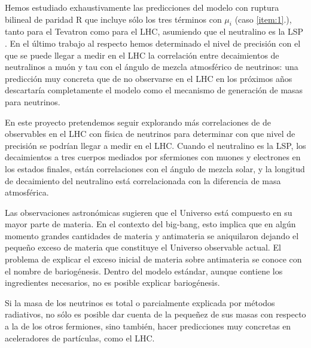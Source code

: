 Hemos estudiado
exhaustivamente las predicciones del modelo con ruptura bilineal de
paridad R que incluye sólo los tres términos con $\mu_i$ (caso
\ref{item:1}.), tanto para el Tevatron como para el LHC, asumiendo que
el neutralino es la LSP
\cite{Magro:2003zb,deCampos:2005ri,deCampos:2007bn,deCampos:2008ic,deCampos:2008re,DeCampos:2010yu}. En
el último trabajo al respecto hemos determinado el nivel de precisión
con el que se puede llegar a medir en el LHC la correlación entre
decaimientos de neutralinos a muón y tau con el ángulo de mezcla
atmosférico de neutrinos: una predicción muy concreta que de no
observarse en el LHC en los próximos años descartaría completamente el
modelo como el mecanismo de generación de masas para neutrinos.
\begin{proyecto}
  En este proyecto pretendemos seguir explorando más correlaciones de
  de observables en el LHC con física de neutrinos para determinar con
  que nivel de precisión se podrían llegar a medir en el LHC. Cuando
  el neutralino es la LSP, los decaimientos a tres cuerpos mediados
  por sfermiones con muones y electrones en los estados finales, están
  correlaciones con el ángulo de mezcla solar, y la longitud de
  decaimiento del neutralino está correlacionada con la diferencia de
  masa atmosférica.
\end{proyecto}




Las observaciones astronómicas sugieren que el Universo está compuesto
en su mayor parte de materia. En el contexto del big-bang, esto
implica que en algún momento grandes cantidades de materia y
antimateria se aniquilaron dejando el pequeño exceso de materia que
constituye el Universo observable actual. El problema de explicar el
exceso inicial de materia sobre antimateria se conoce con el nombre de
bariogénesis. Dentro del modelo estándar, aunque contiene los
ingredientes necesarios, no es posible explicar bariogénesis.


Si la masa de los neutrinos es total o parcialmente explicada por
métodos radiativos, no sólo es posible dar cuenta de la pequeñez de
sus masas con respecto a la de los otros fermiones, sino también,
hacer predicciones muy concretas en aceleradores de partículas, como
el LHC. 

